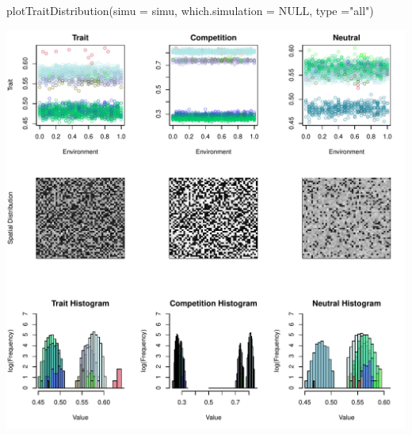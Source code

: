 \documentclass [a4paper]{tufte-book}\usepackage[]{graphicx}\usepackage[]{color}
\makeatletter
\def\maxwidth{ %
  \ifdim\Gin@nat@width>\linewidth
    \linewidth
  \else
    \Gin@nat@width
  \fi
}
\makeatother
\begin{document}
\begin{Schunk}
\begin{Sinput}
plotTraitDistribution(simu = simu, which.simulation = NULL, type ="all")
\end{Sinput}

\includegraphics[width=\maxwidth]{figure/unnamed-chunk-11-1} \end{Schunk}
\end{document}

